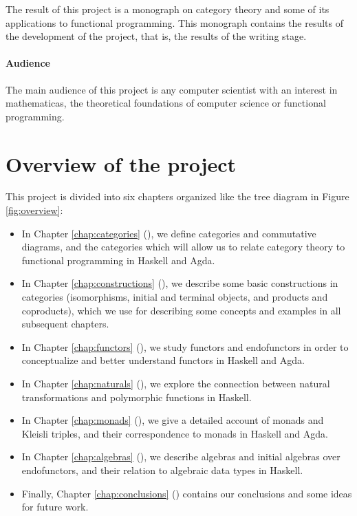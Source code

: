 The result of this project is a monograph on category theory and some
of its applications to functional programming. This monograph contains
the results of the development of the project, that is, the results of
the writing stage.

\paragraph{Audience}

The main audience of this project is any computer scientist with an
interest in mathematicas, the theoretical foundations of computer
science or functional programming.

\section*{Overview of the project}

This project is divided into six chapters organized like the tree
diagram in Figure \ref{fig:overview}:
\begin{itemize}
\item
  In Chapter \ref{chap:categories} (), we
  define categories and commutative diagrams, and the categories which
  will allow us to relate category theory to functional programming in
  Haskell and Agda.

\item
  In Chapter \ref{chap:constructions} (),
  we describe some basic constructions in categories (isomorphisms,
  initial and terminal objects, and products and coproducts), which we
  use for describing some concepts and examples in all subsequent
  chapters.

\item
  In Chapter \ref{chap:functors} (), we study
  functors and endofunctors in order to conceptualize and better
  understand functors in Haskell and Agda.

\item
  In Chapter \ref{chap:naturals} (), we explore
  the connection between natural transformations and polymorphic
  functions in Haskell.

\item
  In Chapter \ref{chap:monads} (), we give a
  detailed account of monads and Kleisli triples, and their
  correspondence to monads in Haskell and Agda.

\item
  In Chapter \ref{chap:algebras} (), we
  describe algebras and initial algebras over endofunctors, and their
  relation to algebraic data types in Haskell.

\item
  Finally, Chapter \ref{chap:conclusions} ()
  contains our conclusions and some ideas for future work.

\end{itemize}

